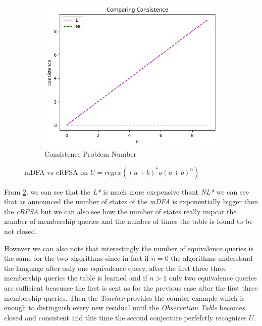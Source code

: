 \begin{figure}[!htb]
\begin{subfigure}[b]{0.3\textwidth}
    \includegraphics[width=\textwidth]{../statistics/plots/wrostDFA/Consistence.png}
    \caption{Consistence Problem Number}
    \label{fig:ConsistenceWrostDFACompare}
  \end{subfigure}
  \caption{mDFA vs cRFSA on $U = regex((a+b)^*a(a+b)^n)$}
  \label{fig:wrostDFA}
\end{figure}

From \cref{fig:wrostDFA}, we can see that the \textit{L*} is much more excpensive thant \textit{NL*} we can see that as announced the number of states of the \textit{mDFA} is exponentially bigger then the \textit{cRFSA} but we can also see how the number of states really impcat the number of membership queries and the number of times the table is found to be not closed.

However we can also note that interestingly the number of equivalence queries is the same for the two algorithms since in fact if $n = 0$ the algorithms understand the language after only one equivalence query, after the first three three membership queries the table is learned and if $n > 1$ only two equivalence queries are sufficient beacuase the first is sent as for the previous case after the first three membership queries. Then the \textit{Teacher} provides the counter-example which is enough to distinguish every new residual until the \textit{Observation Table} becomes closed and consistent and this time the second conjecture perfefctly recognizes $U$.

